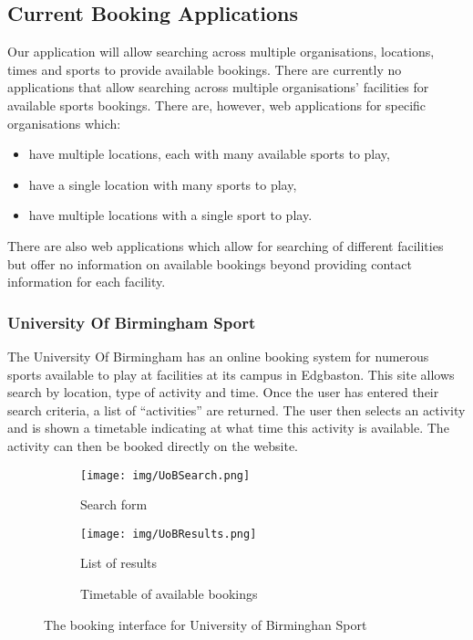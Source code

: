 \subsection{Current Booking Applications}
\label{sub:current_booking_applications}

Our application will allow searching across multiple organisations, locations, times and sports to provide available bookings. There are currently no applications that allow searching across multiple organisations' facilities for available sports bookings. There are, however, web applications for specific organisations which:
\begin{itemize}
        \item have multiple locations, each with many available sports to play,
        \item have a single location with many sports to play,
        \item have multiple locations with a single sport to play.
\end{itemize}
There are also web applications which allow for searching of different facilities but offer no information on available bookings beyond providing contact information for each facility.

\subsubsection{University Of Birmingham Sport}
\label{ssub:university_of_birmingham_sport}

The University Of Birmingham has an online booking system for numerous sports available to play at facilities at its campus in Edgbaston\cite{UOBSport}. This site allows search by location, type of activity and time. Once the user has entered their search criteria, a list of ``activities'' are returned. The user then selects an activity and is shown a timetable indicating at what time this activity is available. The activity can then be booked directly on the website.

\begin{figure}[ht]
\centering
\begin{subfigure}[b]{0.4\textwidth}
                   \texttt{[image: img/UoBSearch.png]}
                   \caption{Search form}\label{fig:UoBSearch}
\end{subfigure}%
\qquad
\begin{subfigure}[b]{0.4\textwidth}
\texttt{[image: img/UoBResults.png]}
\caption{List of results}\label{fig:UoBResults}
            \end{subfigure}
            \qquad
            \begin{subfigure}[b]{0.7\textwidth}
\caption{Timetable of available bookings}\label{fig:UoBTimetable}
\end{subfigure}
\caption{The booking interface for University of Birminghan Sport}\label{fig:animals}
\end{figure}

